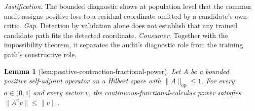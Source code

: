 \documentclass{article}
\newtheorem{lemma}{Lemma}
\begin{document}
\par\smallskip\noindent \textit{Justification.} The bounded diagnostic shows at population level that the common audit assigns positive loss to a residual coordinate omitted by a candidate's own critic. \textit{Gap.} Detection by validation alone does not establish that any trained candidate path fits the detected coordinate. \textit{Consumer.} Together with the impossibility theorem, it separates the audit's diagnostic role from the training path's constructive role.

\begin{lemma}[lem:positive-contraction-fractional-power]\label{lem:positive-contraction-fractional-power}
Let \(A\) be a bounded positive self-adjoint operator on a Hilbert space with \(\|A\|_{\mathrm{op}}\le1\). For every \(a\in(0,1]\) and every vector \(v\), the continuous-functional-calculus power satisfies \(\|A^a v\|\le\|v\|\).
\end{lemma}
\end{document}

